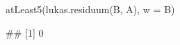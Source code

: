\begin{Schunk}
% --begin: "quant4"
\begin{Sinput}
atLeast5(lukas.residuum(B, A), w = B)
\end{Sinput}
\begin{Soutput}
## [1] 0
\end{Soutput}
%
% --end: "quant4"
\end{Schunk}
